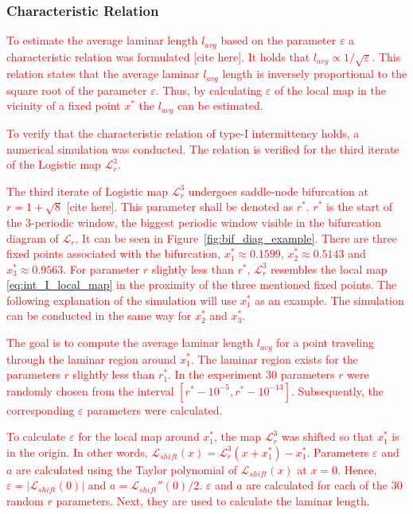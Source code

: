 \subsubsection{Characteristic Relation}
\textcolor{red}{
To estimate the average laminar length $l_{avg}$ based on the parameter $\varepsilon$ a characteristic relation was formulated [cite here].
It holds that $l_{avg} \propto 1/\sqrt{\varepsilon}$.
This relation states that the average laminar $l_{avg}$ length is inversely proportional to the square root of the parameter $\varepsilon$.
Thus, by calculating $\varepsilon$ of the local map in the vicinity of a fixed point $x^{*}$ the $l_{avg}$ can be estimated.
}
\par
\textcolor{red}{
To verify that the characteristic relation of type-I intermittency holds, a numerical simulation was conducted.
The relation is verified for the third iterate of the Logistic map $\mathcal{L}_{r}^{3}$.
}
\par
\textcolor{red}{
The third iterate of Logistic map $\mathcal{L}_{r}^{3}$ undergoes saddle-node bifurcation at $r = 1+\sqrt{8}$ [cite here].
This parameter shall be denoted as $r^{*}$.
$r^{*}$ is the start of the $3$-periodic window, the biggest periodic window visible in the bifurcation diagram of $\mathcal{L}_{r}$.
It can be seen in Figure~\ref{fig:bif_diag_example}.
There are three fixed points associated with the bifurcation, $x^{*}_{1} \approx 0.1599$, $x^{*}_{2} \approx 0.5143$ and $x^{*}_{3} \approx 0.9563$.
For parameter $r$ slightly less than $r^{*}$, $\mathcal{L}_{r}^{3}$ resembles the local map \ref{eq:int_I_local_map} in the proximity of the three mentioned fixed points.
The following explanation of the simulation will use $x^{*}_{1}$ as an example.
The simulation can be conducted in the same way for $x^{*}_{2}$ and $x^{*}_{3}$.
}
\par
\textcolor{red}{
The goal is to compute the average laminar length $l_{avg}$ for a point traveling through the laminar region around $x^{*}_{1}$.
The laminar region exists for the parameters $r$ slightly less than $r^{*}_{1}$.
In the experiment $30$ parameters $r$ were randomly chosen from the interval $[ r^{*}-10^{-5}, r^{*}-10^{-13} ]$.
Subsequently, the corresponding $\varepsilon$ parameters were calculated.
}
\par
\textcolor{red}{
To calculate $\varepsilon$ for the local map around $x^{*}_{1}$, the map $\mathcal{L}_{r}^{3}$ was shifted so that $x^{*}_{1}$ is in the origin.
In other words, $\mathcal{L}_{shift}(x) = \mathcal{L}_{r}^{3}(x + x^{*}_{1}) - x^{*}_{1}$.
Parameters $\varepsilon$ and $a$ are calculated using the Taylor polynomial of $\mathcal{L}_{shift}(x)$ at $x = 0$.
Hence, $\varepsilon = | \mathcal{L}_{shift}(0) |$ and $a = \mathcal{L}_{shift}''(0) / 2$.
$\varepsilon$ and $a$ are calculated for each of the $30$ random $r$ parameters.
Next, they are used to calculate the laminar length.
}
